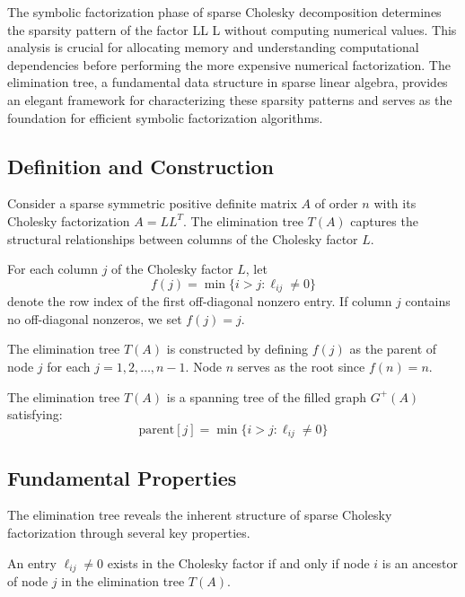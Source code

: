The symbolic factorization phase of sparse Cholesky decomposition determines the sparsity pattern of the factor LL
L without computing numerical values. This analysis is crucial for allocating memory and understanding computational dependencies before performing the more expensive numerical factorization. The elimination tree, a fundamental data structure in sparse linear algebra, provides an elegant framework for characterizing these sparsity patterns and serves as the foundation for efficient symbolic factorization algorithms.

\subsection{Definition and Construction}

Consider a sparse symmetric positive definite matrix \(A\) of order \(n\) with its Cholesky factorization \(A = LL^T\). The elimination tree \(T(A)\) captures the structural relationships between columns of the Cholesky factor \(L\).

\begin{definition}
For each column \(j\) of the Cholesky factor \(L\), let
\[
f(j) = \min\{i > j : \ell_{ij} \neq 0\}
\]
denote the row index of the first off-diagonal nonzero entry. If column \(j\) contains no off-diagonal nonzeros, we set \(f(j) = j\).
\end{definition}

The elimination tree \(T(A)\) is constructed by defining \(f(j)\) as the parent of node \(j\) for each \(j = 1, 2, \ldots, n-1\). Node \(n\) serves as the root since \(f(n) = n\).

\begin{theorem}
The elimination tree \(T(A)\) is a spanning tree of the filled graph \(G^+(A)\) satisfying:
\[
\text{parent}[j] = \min\{i > j : \ell_{ij} \neq 0\}
\]
\end{theorem}

\subsection{Fundamental Properties}

The elimination tree reveals the inherent structure of sparse Cholesky factorization through several key properties.

\begin{theorem}
An entry \(\ell_{ij} \neq 0\) exists in the Cholesky factor if and only if node \(i\) is an ancestor of node \(j\) in the elimination tree \(T(A)\).
\end{theorem}

